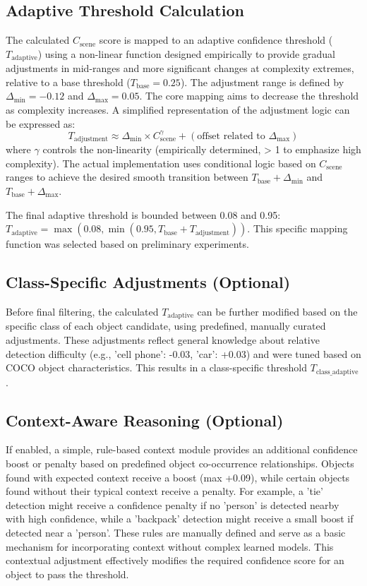 \documentclass{article}
\begin{document}
\subsection{Adaptive Threshold Calculation}
The calculated \( C_{\text{scene}} \) score is mapped to an adaptive confidence threshold (\( T_{\text{adaptive}} \)) using a non-linear function designed empirically to provide gradual adjustments in mid-ranges and more significant changes at complexity extremes, relative to a base threshold (\( T_{\text{base}} = 0.25 \)). The adjustment range is defined by \( \Delta_{\min} = -0.12 \) and \( \Delta_{\max} = 0.05 \). The core mapping aims to decrease the threshold as complexity increases. A simplified representation of the adjustment logic can be expressed as:
\[ T_{\text{adjustment}} \approx \Delta_{\min} \times C_{\text{scene}}^\gamma + (\text{offset related to } \Delta_{\max}) \]
where \( \gamma \) controls the non-linearity (empirically determined, > 1 to emphasize high complexity). The actual implementation uses conditional logic based on \( C_{\text{scene}} \) ranges to achieve the desired smooth transition between \( T_{\text{base}} + \Delta_{\min} \) and \( T_{\text{base}} + \Delta_{\max} \).

The final adaptive threshold is bounded between 0.08 and 0.95: \( T_{\text{adaptive}} = \max(0.08, \min(0.95, T_{\text{base}} + T_{\text{adjustment}})) \). This specific mapping function was selected based on preliminary experiments.

\subsection{Class-Specific Adjustments (Optional)}
Before final filtering, the calculated \( T_{\text{adaptive}} \) can be further modified based on the specific class of each object candidate, using predefined, manually curated adjustments. These adjustments reflect general knowledge about relative detection difficulty (e.g., 'cell phone': -0.03, 'car': +0.03) and were tuned based on COCO object characteristics. This results in a class-specific threshold \( T_{\text{class\_adaptive}} \).

\subsection{Context-Aware Reasoning (Optional)}
If enabled, a simple, rule-based context module provides an additional confidence boost or penalty based on predefined object co-occurrence relationships. Objects found with expected context receive a boost (max +0.09), while certain objects found without their typical context receive a penalty. For example, a 'tie' detection might receive a confidence penalty if no 'person' is detected nearby with high confidence, while a 'backpack' detection might receive a small boost if detected near a 'person'. These rules are manually defined and serve as a basic mechanism for incorporating context without complex learned models. This contextual adjustment effectively modifies the required confidence score for an object to pass the threshold.
\end{document}
